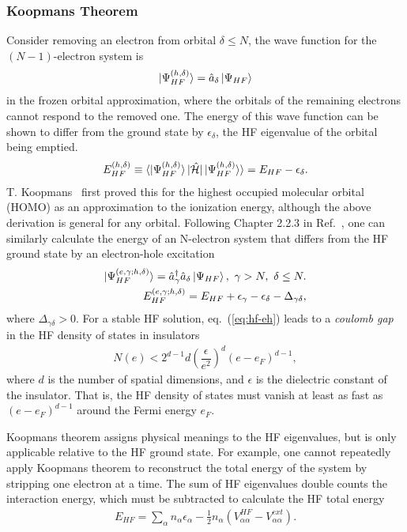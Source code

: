 \subsubsection{Koopmans Theorem}
Consider removing an electron from orbital $\delta\le N$, the wave function for the $(N-1)$-electron system is~\cite{Giuliani2005}
\begin{align}
\ket{\Psi_{HF}^{(h,\delta)}} = \hat{a}_\delta\ket{\Psi_{HF}}
\end{align}
in the frozen orbital approximation, where the orbitals of the remaining electrons cannot respond to the removed one. The energy of this wave function can be shown to differ from the ground state by $\epsilon_\delta$, the HF eigenvalue of the orbital being emptied.
\begin{align}
E_{HF}^{(h,\delta)} \equiv \braket{\ket{\Psi_{HF}^{(h,\delta)}}|\hat{\mathcal{H}}|\ket{\Psi_{HF}^{(h,\delta)}}} = E_{HF} - \epsilon_\delta.
\end{align}
T. Koopmans~\cite{Koopmans1934} first proved this for the highest occupied molecular orbital (HOMO) as an approximation to the ionization energy, although the above derivation is general for any orbital.
Following Chapter 2.2.3 in Ref.~\cite{Giuliani2005}, one can similarly calculate the energy of an N-electron system that differs from the HF ground state by an electron-hole excitation
\begin{align}
\ket{\Psi_{HF}^{(e,\gamma;h,\delta)}} = \hat{a}_\gamma^\dagger \hat{a}_\delta \ket{\Psi_{HF}}, ~\gamma>N,~\delta\le N. \\
E_{HF}^{(e,\gamma;h,\delta)} = E_{HF}+\epsilon_\gamma-\epsilon_\delta-\Delta_{\gamma\delta},
\label{eq:hf-eh}
\end{align}
where $\Delta_{\gamma\delta}>0$. For a stable HF solution, eq.~(\ref{eq:hf-eh}) leads to a \textit{coulomb gap} in the HF density of states in insulators
\begin{align}
N(e) < 2^{d-1}d\left(\dfrac{\epsilon}{e^2}\right)^d(e-e_F)^{d-1},
\end{align}
where $d$ is the number of spatial dimensions, and $\epsilon$ is the dielectric constant of the insulator. That is, the HF density of states must vanish at least as fast as $(e-e_F)^{d-1}$ around the Fermi energy $e_F$.

Koopmans theorem assigns physical meanings to the HF eigenvalues, but is only applicable relative to the HF ground state. For example, one cannot repeatedly apply Koopmans theorem to reconstruct the total energy of the system by stripping one electron at a time. The sum of HF eigenvalues double counts the interaction energy, which must be subtracted to calculate the HF total energy
\begin{align}
E_{HF} = \sum\limits_{\alpha} n_\alpha \epsilon_\alpha - \frac{1}{2}n_\alpha (V_{\alpha\alpha}^{HF}-V_{\alpha\alpha}^{ext}).
\end{align}


